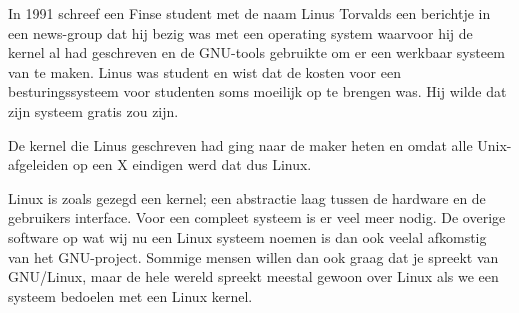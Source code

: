 In 1991 schreef een Finse student met de naam Linus Torvalds een berichtje in een news-group dat hij bezig was met een operating system waarvoor hij de kernel al had geschreven en de GNU-tools gebruikte om er een werkbaar systeem van te maken. Linus was student en wist dat de kosten voor een besturingssysteem voor studenten soms moeilijk op te brengen was. Hij wilde dat zijn systeem gratis zou zijn.

De kernel die Linus geschreven had ging naar de maker heten en omdat alle Unix-afgeleiden op een X eindigen werd dat dus Linux.

Linux is zoals gezegd een kernel; een abstractie laag tussen de hardware en de gebruikers interface. Voor een compleet systeem is er veel meer nodig. De overige software op wat wij nu een Linux systeem noemen is dan ook veelal afkomstig van het GNU-project. Sommige mensen willen dan ook graag dat je spreekt van GNU/Linux, maar de hele wereld spreekt meestal gewoon over Linux als we een systeem bedoelen met een Linux kernel.

